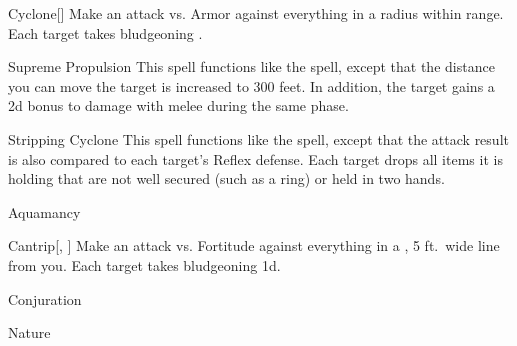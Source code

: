 \lowercase{\hypertarget{spell:Cyclone}{}}\label{spell:Cyclone}
\begin{ability}[\nth{4}]{\hypertarget{spell:Cyclone}{Cyclone}}[]
Make an attack vs. Armor against everything in a \areamed radius within \rngmed range.
\hit Each target takes bludgeoning .
\end{ability}
\vspace{0.25em}



\lowercase{\hypertarget{spell:Supreme Propulsion}{}}\label{spell:Supreme Propulsion}
\begin{ability}[\nth{4}]{\hypertarget{spell:Supreme Propulsion}{Supreme Propulsion}}
This spell functions like the  spell, except that the distance you can move the target is increased to 300 feet.
In addition, the target gains a \plus2d bonus to damage with melee  during the same phase.
\end{ability}
\vspace{0.25em}



\lowercase{\hypertarget{spell:Stripping Cyclone}{}}\label{spell:Stripping Cyclone}
\begin{ability}[\nth{6}]{\hypertarget{spell:Stripping Cyclone}{Stripping Cyclone}}
This spell functions like the  spell, except that the attack result is also compared to each target's Reflex defense.
\hit Each target drops all items it is holding that are not well secured (such as a ring) or held in two hands.
\end{ability}
\vspace{0.25em}


\newpage
\begin{spellsection}{Aquamancy}

\begin{spellheader}
\end{spellheader}


\begin{ability}{Cantrip}[, ]
Make an attack vs. Fortitude against everything in a \areamed, 5 ft.\ wide line from you.
\hit Each target takes bludgeoning  \minus1d.
\end{ability}




 Conjuration

 Nature
\end{spellsection}


